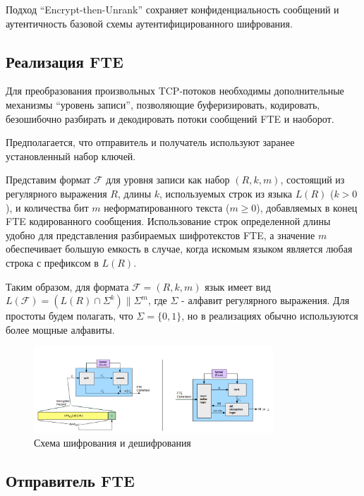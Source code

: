 Подход ``Encrypt-then-Unrank'' сохраняет конфиденциальность сообщений и аутентичность базовой схемы аутентифицированного шифрования.


\subsection{Реализация FTE}

Для преобразования произвольных TCP-потоков необходимы дополнительные механизмы ``уровень записи'',
позволяющие буферизировать, кодировать, безошибочно разбирать и декодировать потоки сообщений FTE и наоборот.

Предполагается, что отправитель и получатель используют заранее установленный набор ключей.

Представим формат $\mathcal{F}$ для уровня записи как набор $(R, k, m)$, состоящий из регулярного выражения $R$,
длины $k$, используемых строк из языка $L(R)$ ($k > 0$), и количества бит $m$ неформатированного текста ($m \geq 0$),
добавляемых в конец FTE кодированного сообщения. Использование строк определенной длины удобно для представления разбираемых шифротекстов FTE,
а значение $m$ обеспечивает большую емкость в случае, когда искомым языком является любая строка с префиксом в $L(R)$.

Таким образом, для формата $\mathcal{F} = (R, k, m)$ язык имеет вид $L(\mathcal{F}) = (L(R) \cap \Sigma^k) \| \Sigma^m$, где $\Sigma$ - алфавит регулярного выражения.
Для простоты будем полагать, что $\Sigma = \{0, 1\}$, но в реализациях обычно используются более мощные алфавиты.

\begin{figure}[h!]
    \begin{center}
        \includegraphics[width = 0.8\textwidth]{FTE_record_layer.png}
        \caption{Схема шифрования и дешифрования}
    \end{center}
\end{figure}

\subsection{Отправитель FTE}

